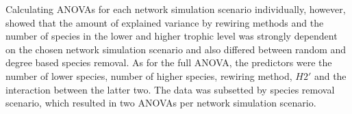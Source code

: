 \documentclass[12pt,a4paper]{article}
\begin{document}

Calculating ANOVAs for each network simulation scenario individually, however, showed that the amount of explained variance by rewiring methods and the number of species in the lower and higher trophic level was strongly dependent on the chosen network simulation scenario and also differed between random and degree based species removal. As for the full ANOVA, the predictors were the number of lower species, number of higher species, rewiring method, $H2'$ and the interaction between the latter two. The data was subsetted by species removal scenario, which resulted in two ANOVAs per network simulation scenario. 
\end{document}
